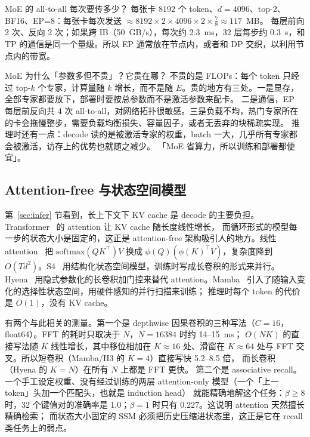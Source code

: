 \begin{est}{MoE 的 all-to-all 每次要传多少？}
每张卡 8192 个 token、$d=4096$、top-2、BF16、EP=8：每张卡每次发送 $\approx8192\times2\times4096\times2\times\frac{7}{8}\approx117$~MB。
每层前向 2 次、反向 2 次；如果跨 IB（50~GB/s），每次约 2.3~ms，32 层每步约 0.3~s，和 TP 的通信是同一个量级。所以 EP 通常放在节点内，或者和 DP 交织，以利用节点内的带宽。
\end{est}

\begin{qa}{MoE 为什么「参数多但不贵」？它贵在哪？}
\ans 不贵的是 FLOPs：每个 token 只经过 top-$k$ 个专家，计算量随 $k$ 增长，而不是随 $E$。贵的地方有三处。一是显存，全部专家都要放下，部署时要按总参数而不是激活参数来配卡。
二是通信，EP 每层前反向共 4 次 all-to-all，对网络拓扑很敏感。三是负载不均，热门专家所在的卡会拖慢整步，需要负载均衡损失、容量因子，或者无丢弃的块稀疏实现。
推理时还有一点：decode 读的是被激活专家的权重，batch 一大，几乎所有专家都会被激活，访存上的优势也就随之减少。
\wrong 「MoE 省算力，所以训练和部署都便宜」。
\end{qa}

\subsection{Attention-free 与状态空间模型}

第~\ref{sec:infer} 节看到，长上下文下 KV cache 是 decode 的主要负担。Transformer~\cite{vaswani2017attention} 的 attention 让 KV cache 随长度线性增长，
而循环形式的模型每一步的状态大小是固定的，这正是 attention-free 架构吸引人的地方。线性 attention~\cite{katharopoulos2020transformers} 把 $\mathrm{softmax}(QK^\top)V$
换成 $\phi(Q)(\phi(K)^\top V)$，复杂度降到 $O(Td^2)$。S4~\cite{gu2022efficiently} 用结构化状态空间模型，训练时写成长卷积的形式来并行。
Hyena~\cite{poli2023hyena} 用隐式参数化的长卷积加门控来替代 attention。Mamba~\cite{gu2023mamba} 引入了随输入变化的选择性状态空间，用硬件感知的并行扫描来训练；
推理时每个 token 的代价是 $O(1)$，没有 KV cache。

有两个与此相关的测量。第一个是 depthwise 因果卷积的三种写法（$C=16$，float64）。FFT 的耗时只取决于 $N$，$N=16384$ 时约 14--15~ms；
$O(NK)$ 的直接写法随 $K$ 线性增长，其中移位相加在 $K\approx16$ 处、滑窗在 $K\approx64$ 处与 FFT 交叉。所以短卷积（Mamba/H3 的 $K=4$）直接写快 5.2--8.5 倍，
而长卷积（Hyena 的 $K=N$）在所有 $N$ 上都是 FFT 更快。
第二个是 associative recall。一个手工设定权重、没有经过训练的两层 attention-only 模型（一个「上一 token」头加一个匹配头，也就是 induction head）
就能精确地解这个任务：$\beta\ge8$ 时，32 个键值对的准确率是 1.0；$\beta=1$ 时只有 0.227。这说明 attention 天然擅长精确检索；
而状态大小固定的 SSM 必须把历史压缩进状态里，这正是它在 recall 类任务上的弱点。

